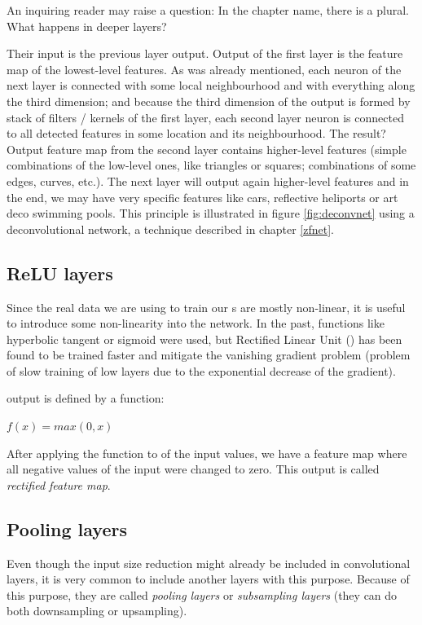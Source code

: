 An inquiring reader may raise a question: In the chapter name, there is a 
plural. What happens in deeper layers? 

Their input is the previous layer output. Output of the first layer is the 
feature map of the lowest-level features. As was already mentioned, each neuron 
of the next layer is connected with some local neighbourhood and with everything 
along the third dimension; and because the third dimension of the output is 
formed by stack of filters / kernels of the first layer, each second layer 
neuron is connected to all detected features in some location and its 
neighbourhood. The result? Output feature map from the second layer contains 
higher-level features (simple combinations of the low-level ones, like triangles 
or squares; combinations of some edges, curves, etc.). The next layer 
will output again higher-level features and in the end, we may have very 
specific features like cars, reflective heliports or art deco swimming pools. 
This principle is illustrated in figure \ref{fig:deconvnet} using a 
deconvolutional network, a technique described in chapter \ref{zfnet}.

\subsection{ReLU layers}
\label{relu-layers}

Since the real data we are using to train our s are mostly non-linear, 
it is useful to introduce some non-linearity into the network. In the past, 
functions like hyperbolic tangent or sigmoid were used, but Rectified Linear 
Unit () has been found to be trained faster and mitigate the vanishing 
gradient problem (problem of slow training of low layers due to the exponential 
decrease of the gradient). 

 output is defined by a function:

$f(x) = max(0, x)$

After applying the  function to of the input values, we have a feature 
map where all negative values of the input were changed to zero. This output is 
called \textit{rectified feature map}. 

\subsection{Pooling layers}
\label{pooling}

Even though the input size reduction might already be included in convolutional 
layers, it is very common to include another layers with this purpose. Because 
of this purpose, they are called \textit{pooling layers} or \textit{subsampling 
layers} (they can do both downsampling or upsampling). 

